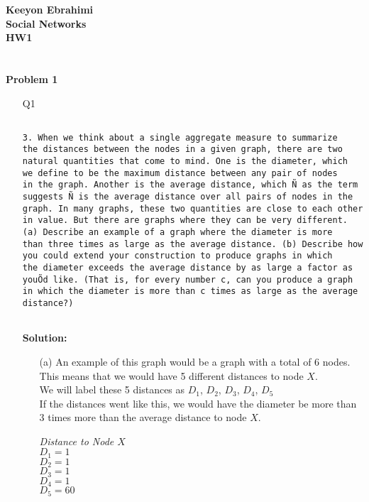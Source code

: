 \documentclass[ruled]{article}
\begin{document}
\textbf{Keeyon Ebrahimi}\\
\textbf{Social Networks}\\
\textbf{HW1}\\ \\ \\
\textbf{Problem 1}

\begin{itemize}
\item[Q1] 
\begin{verbatim}

3. When we think about a single aggregate measure to summarize
the distances between the nodes in a given graph, there are two
natural quantities that come to mind. One is the diameter, which
we define to be the maximum distance between any pair of nodes
in the graph. Another is the average distance, which Ñ as the term
suggests Ñ is the average distance over all pairs of nodes in the
graph. In many graphs, these two quantities are close to each other
in value. But there are graphs where they can be very different.
(a) Describe an example of a graph where the diameter is more
than three times as large as the average distance. (b) Describe how
you could extend your construction to produce graphs in which
the diameter exceeds the average distance by as large a factor as
youÕd like. (That is, for every number c, can you produce a graph
in which the diameter is more than c times as large as the average
distance?)


\end{verbatim}
\textbf{Solution: }\\
\begin{itemize}
\item[(a)]  An example of this graph would be a graph with a total of 6 nodes.  This means that we would have 5 different distances to node $X$.\\
We will label these 5 distances as $D_1$, $D_2$, $D_3$, $D_4$, $D_5$
\\
If the distances went like this, we would have the diameter be more than $3$ times more than the average distance to node $X$.

\textit{Distance to Node $X$}
\\
$D_1 = 1$ \\
$D_2 = 1$ \\
$D_3 = 1$ \\
$D_4 = 1$ \\
$D_5 = 60$ \\
\\


\end{itemize}
\end{itemize}
\end{document}
